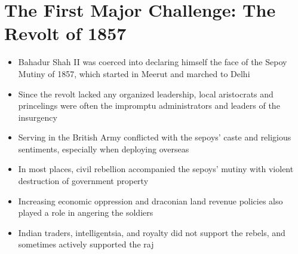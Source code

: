 \section{The First Major Challenge: The Revolt of 1857}

\begin{itemize}
    \item Bahadur Shah II was coerced into declaring himself the face of the Sepoy Mutiny of 1857, which started in Meerut and marched to Delhi
    \item Since the revolt lacked any organized leadership, local aristocrats and princelings were often the impromptu administrators and leaders of the insurgency
    \item Serving in the British Army conflicted with the sepoys' caste and religious sentiments, especially when deploying overseas
    \item In most places, civil rebellion accompanied the sepoys' mutiny with violent destruction of government property
    \item Increasing economic oppression and draconian land revenue policies also played a role in angering the soldiers
    \item Indian traders, intelligentsia, and royalty did not support the rebels, and sometimes actively supported the \Gls{raj}
\end{itemize}

